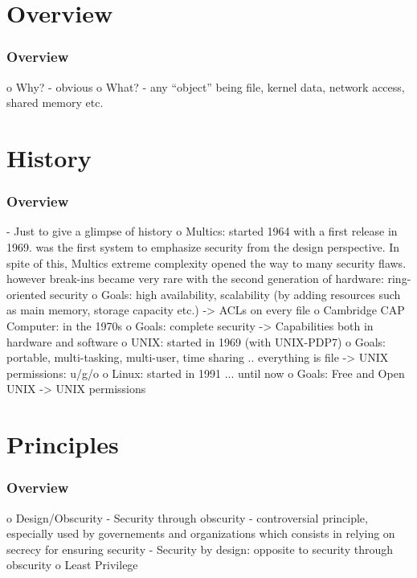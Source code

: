 %
%

\section{Overview}


\begin{frame}
  \frametitle{Overview}

  o Why?
    - obvious
  o What?
    - any ``object'' being file, kernel data, network access, shared memory etc.
\end{frame}

%
%

\section{History}


\begin{frame}
  \frametitle{Overview}

  - Just to give a glimpse of history
  o Multics: started 1964 with a first release in 1969.
             was the first system to emphasize security from the design perspective. In spite of this,
             Multics extreme complexity opened the way to many security flaws.
             however break-ins became very rare with the second generation of hardware: ring-oriented security
    o Goals: high availability, scalability (by adding resources such as main memory, storage capacity etc.)
             -> ACLs on every file
  o Cambridge CAP Computer: in the 1970s
    o Goals: complete security
             -> Capabilities both in hardware and software
  o UNIX: started in 1969 (with UNIX-PDP7)
    o Goals: portable, multi-tasking, multi-user, time sharing .. everything is file
             -> UNIX permissions: u/g/o
  o Linux: started in 1991 ... until now
    o Goals: Free and Open UNIX
             -> UNIX permissions
\end{frame}

%
%

\section{Principles}


\begin{frame}
  \frametitle{Overview}

  o Design/Obscurity
    - Security through obscurity
        - controversial principle, especially used by governements and organizations which consists in
          relying on secrecy for ensuring security
    - Security by design: opposite to security through obscurity
  o Least Privilege
\end{frame}

